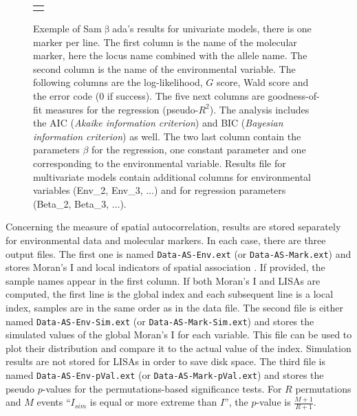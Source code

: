 \documentclass[a4paper,11pt]{article}
\newcommand{\smb}{\textsf{Sam$\upbeta$ada}}
\newcommand{\prog}[1]{\texttt{#1}}
\begin{document}
\begin{figure}[htbp]
\begin{turn}{90}
\begin{tabular}{c}
\\
\begin{minipage}{1.2\textheight}
\caption[Extrait d'un fichier de résultats de \smb\ pour des modèles univariés.]
{Exemple of \smb's results for univariate models, there is one marker per line.
The first column is the name of the molecular marker, here the locus name combined with the allele name.
The second column is the name of the environmental variable.
The following columns are the log-likelihood, $G$ score, Wald score and the error code ($0$ if success).
The five next columns are goodness-of-fit measures for the regression (pseudo-$R^2$).
The analysis includes the AIC (\textit{Akaike information criterion}) and BIC (\textit{Bayesian information criterion}) as well.
The two last column contain the parameters $\beta$ for the regression, one constant parameter and one corresponding to the environmental variable.
Results file for multivariate models contain additional columns for environmental variables (Env\_2, Env\_3, $\dots$) and for regression parameters (Beta\_2, Beta\_3, $\dots$).
}
\label{fig:fichier-res-univ}
\end{minipage}\\
\end{tabular}
\end{turn}
\hfill
\end{figure}


Concerning the measure of spatial autocorrelation, results are stored separately for environmental data and molecular markers.
In each case, there are three output files.
The first one is named \prog{Data-AS-Env.ext} (or \prog{Data-AS-Mark.ext}) and stores Moran's I and local indicators of spatial association \parencite{anselin:1995}.
If provided, the sample names appear in the first column.
If both Moran's I and LISAs are computed, the first line is the global index and each subsequent line is a local index, samples are in the same order as in the data file.
The second file is either named \prog{Data-AS-Env-Sim.ext} (or \prog{Data-AS-Mark-Sim.ext}) and stores the simulated values of the global Moran's I for each variable.
This file can be used to plot their distribution and compare it to the actual value of the index.
Simulation results are not stored for LISAs in order to save disk space.
The third file is named \prog{Data-AS-Env-pVal.ext} (or \prog{Data-AS-Mark-pVal.ext}) and stores the pseudo $p$-values for the permutations-based significance tests.
For $R$ permutations and $M$ events \enquote{$I_{sim}$ is equal or more extreme than $I$}, the $p$-value is $\frac{M+1}{R+1}$.
\end{document}
